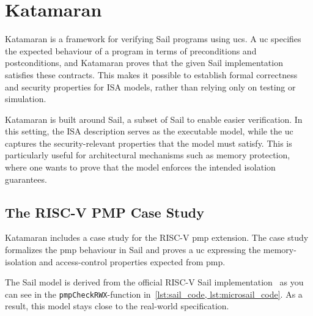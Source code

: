 
\chapter{Katamaran}
Katamaran is a framework for verifying \textmu{}Sail programs using \glspl{uc}. 
A \gls{uc} specifies the expected behaviour of a program in terms of preconditions and postconditions, and Katamaran proves that the given \textmu{}Sail implementation satisfies these contracts. 
This makes it possible to establish formal correctness and security properties for ISA models, rather than relying only on testing or simulation.~\cite{universal_contract}

Katamaran is built around \textmu{}Sail, a subset of Sail to enable easier verification.
In this setting, the ISA description serves as the executable model, while the \gls{uc} captures the security-relevant properties that the model must satisfy.
This is particularly useful for architectural mechanisms such as memory protection, where one wants to prove that the model enforces the intended isolation guarantees.

\section{The RISC-V PMP Case Study}
Katamaran includes a case study for the RISC-V \gls{pmp} extension. 
The case study formalizes the \gls{pmp} behaviour in \textmu{}Sail and proves a \gls{uc} expressing the memory-isolation and access-control properties expected from \gls{pmp}.

The \textmu{}Sail model is derived from the official RISC-V Sail implementation~\cite{risc-v_sail} as you can see in the \texttt{pmpCheckRWX}-function in~\cref{lst:sail_code, lst:microsail_code}. %
As a result, this model stays close to the real-world specification.

